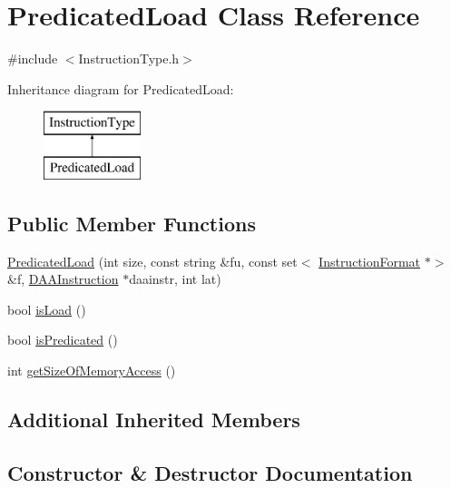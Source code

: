 \hypertarget{classPredicatedLoad}{}\section{Predicated\+Load Class Reference}
\label{classPredicatedLoad}


{\ttfamily \#include $<$Instruction\+Type.\+h$>$}

Inheritance diagram for Predicated\+Load\+:\begin{figure}[H]
\begin{center}
\leavevmode
\includegraphics[height=2.000000cm]{classPredicatedLoad}
\end{center}
\end{figure}
\subsection*{Public Member Functions}
\begin{DoxyCompactItemize}
\item 
\hyperlink{classPredicatedLoad_a51029c14a98b327ab6acb15be5835057}{Predicated\+Load} (int size, const string \&fu, const set$<$ \hyperlink{classInstructionFormat}{Instruction\+Format} $\ast$$>$ \&f, \hyperlink{classDAAInstruction}{D\+A\+A\+Instruction} $\ast$daainstr, int lat)
\item 
bool \hyperlink{classPredicatedLoad_a6eba0b6ea212b012d2015fb023804fc3}{is\+Load} ()
\item 
bool \hyperlink{classPredicatedLoad_aebf98efc7d6d09ec1d8f9c578a65e156}{is\+Predicated} ()
\item 
int \hyperlink{classPredicatedLoad_a0f4d0a0830281e9f87c733eb253a1a5e}{get\+Size\+Of\+Memory\+Access} ()
\end{DoxyCompactItemize}
\subsection*{Additional Inherited Members}


\subsection{Constructor \& Destructor Documentation}
\mbox{\label{classPredicatedLoad_a51029c14a98b327ab6acb15be5835057}} 
